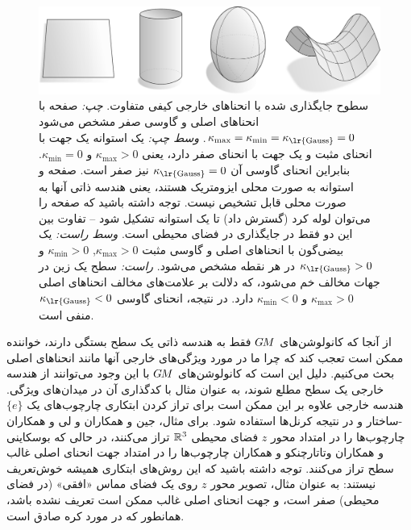 \begin{figure}
    \centering
    \includegraphics[width=1.\textwidth]{figures/curvature_surfaces.pdf}
    \caption{\small
        سطوح جایگذاری شده با انحناهای خارجی کیفی متفاوت.
        \textit{چپ:}
        صفحه با انحناهای اصلی و گاوسی صفر مشخص می‌شود
        $\kappa_{\max} = \kappa_{\min} = \kappa_{\textup{\lr{Gauss}}} = 0$.
        \textit{وسط چپ:}
        یک استوانه یک جهت با انحنای مثبت و یک جهت با انحنای صفر دارد، یعنی
        $\kappa_{\max} > 0$ و $\kappa_{\min} = 0$.
        بنابراین انحنای گاوسی آن $\kappa_{\textup{\lr{Gauss}}} = 0$ نیز صفر است.
        صفحه و استوانه به صورت محلی ایزومتریک هستند، یعنی هندسه ذاتی آنها به صورت محلی قابل تشخیص نیست.
        توجه داشته باشید که صفحه را می‌توان لوله کرد (گسترش داد) تا یک استوانه تشکیل شود -- تفاوت بین این دو فقط در جایگذاری در فضای محیطی است.
        \textit{وسط راست:}
        یک بیضی‌گون با انحناهای اصلی و گاوسی مثبت $\kappa_{\max} > 0$, $\kappa_{\min} > 0$ و $\kappa_{\textup{\lr{Gauss}}} > 0$ در هر نقطه مشخص می‌شود.
        \textit{راست:}
        سطح یک زین در جهات مخالف خم می‌شود، که دلالت بر علامت‌های مخالف انحناهای اصلی $\kappa_{\max} > 0$ و $\kappa_{\min} < 0$ دارد.
        در نتیجه، انحنای گاوسی $\kappa_{\textup{\lr{Gauss}}} < 0$ منفی است.
    }
    \label{fig:curvature_surfaces}
\end{figure}

از آنجا که کانولوشن‌های $G\mkern-1.4muM$ فقط به هندسه ذاتی یک سطح بستگی دارند، خواننده ممکن است تعجب کند که چرا ما در مورد ویژگی‌های خارجی آنها مانند انحناهای اصلی بحث می‌کنیم.
دلیل این است که کانولوشن‌های $G\mkern-1.4muM$ با این وجود می‌توانند از هندسه خارجی یک سطح مطلع شوند، به عنوان مثال با کدگذاری آن در میدان‌های ویژگی.
هندسه خارجی علاوه بر این ممکن است برای تراز کردن ابتکاری چارچوب‌های یک $\{e\}$-ساختار و در نتیجه کرنل‌ها استفاده شود.
برای مثال، جین و همکاران \cite{jin2018learning} و  لی و همکاران \cite{li2019crossAtlas}چارچوب‌ها را در امتداد محور $z$ فضای محیطی $\mathbb{R}^3$ تراز می‌کنند، در حالی که بوسکاینی و همکاران \cite{boscaini2016learning} وتاتارچنکو و همکاران  \cite{tatarchenko2018tangent} چارچوب‌ها را در امتداد جهت انحنای اصلی غالب سطح تراز می‌کنند.
توجه داشته باشید که این روش‌های ابتکاری همیشه خوش‌تعریف نیستند:
به عنوان مثال، تصویر محور $z$ روی یک فضای مماس «افقی» (در فضای محیطی) صفر است،
و جهت انحنای اصلی غالب ممکن است تعریف نشده باشد، همانطور که در مورد کره صادق است.






















